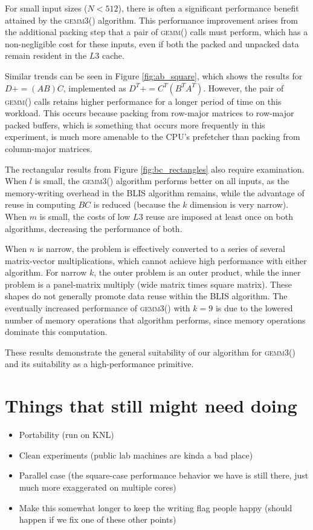 \documentclass[12pt]{article}
\newcommand*{\pluseq}{\mathrel{{+}{=}}}
\newcommand*{\gemmt}{{\textsc{gemm3()}}}
\newcommand*{\gemm}{{\textsc{gemm()}}}
\begin{document}
For small input sizes ($N < 512$), there is often a significant performance benefit attained by the \gemmt{} algorithm.
This performance improvement arises from the additional packing step that a pair of \gemm{} calls must perform, which has a non-negligible cost for these inputs, even if both the packed and unpacked data remain resident in the $L3$ cache.

Similar trends can be seen in Figure \ref{fig:ab_square}, which shows the results for $D \pluseq (AB)C$, implemented as $D^T \pluseq C^T(B^TA^T)$.
However, the pair of \gemm{} calls retains higher performance for a longer period of time on this workload.
This occurs because packing from row-major matrices to row-major packed buffers, which is something that occurs more frequently in this experiment, is much more amenable to the CPU's prefetcher than packing from column-major matrices.

The rectangular results from Figure \ref{fig:bc_rectangles} also require examination.
When $l$ is small, the \gemmt{} algorithm performs better on all inputs, as the memory-writing overhead in the BLIS algorithm remains, while the advantage of reuse in computing $BC$ is reduced (because the $k$ dimension is very narrow).
When $m$ is small, the costs of low $L3$ reuse are imposed at least once on both algorithms, decreasing the performance of both.

When $n$ is narrow, the problem is effectively converted to a series of several matrix-vector multiplications, which cannot achieve high performance with either algorithm.
For narrow $k$, the outer problem is an outer product, while the inner problem is a panel-matrix multiply (wide matrix times square matrix).
These shapes do not generally promote data reuse within the BLIS algorithm.
The eventually increased performance of \gemmt{} with $k = 9$ is due to the lowered number of memory operations that algorithm performs, since memory operations dominate this computation.

These results demonstrate the general suitability of our algorithm for \gemmt{} and its suitability as a high-performance primitive.

\section{Things that still might need doing}
\begin{itemize}
\item Portability (run on KNL)
\item Clean experiments (public lab machines are kinda a bad place)
\item Parallel case (the square-case performance behavior we have is still there, just much more exaggerated on multiple cores)
\item Make this somewhat longer to keep the writing flag people happy (should happen if we fix one of these other points)
\end{itemize}
\printbibliography{}
\end{document}
